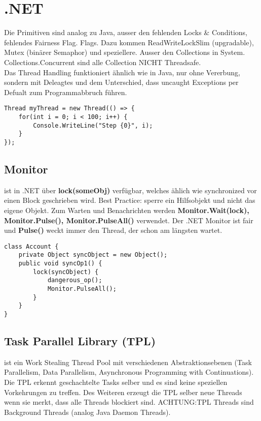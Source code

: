 \section{.NET}
Die Primitiven sind analog zu Java, ausser den fehlenden Locks \& Conditions, fehlendes Fairness Flag. Flags. Dazu kommen ReadWriteLockSlim (upgradable), Mutex (binärer Semaphor) und speziellere. Ausser den Collections in System. Collections.Concurrent sind alle Collection NICHT Threadsafe. \\

Das Thread Handling funktioniert ähnlich wie in Java, nur ohne Vererbung, sondern mit Deleagtes und dem Unterschied, dass uncaught Exceptions per Defualt zum Programmabbruch führen. 

\begin{lstlisting}[style=csharp]
Thread myThread = new Thread(() => {
	for(int i = 0; i < 100; i++) {
		Console.WriteLine("Step {0}", i);
	}
});
\end{lstlisting}

\subsection{Monitor}
ist in .NET über \textbf{lock(someObj)} verfügbar, welches ählich wie synchronized vor einen Block geschrieben wird. Best Practice: sperre ein Hilfsobjekt und nicht das eigene Objekt. Zum Warten und Benachrichten werden \textbf{Monitor.Wait(lock), Monitor.Pulse(), Monitor.PulseAll()} verwendet. Der .NET Monitor ist fair und \textbf{Pulse()} weckt immer den Thread, der schon am längsten wartet.

\begin{lstlisting}[style=csharp]
class Account {
	private Object syncObject = new Object();
	public void syncOp1() {
		lock(syncObject) {
			dangerous_op();
			Monitor.PulseAll();
		}
	}
}
\end{lstlisting}

\subsection{Task Parallel Library (TPL)}
ist ein Work Stealing Thread Pool mit verschiedenen Abstraktionsebenen (Task Parallelism, Data Parallelism, Asynchronous Programming with Continuations). Die TPL erkennt geschachtelte Tasks selber und es sind keine speziellen Vorkehrungen zu treffen. Des Weiteren erzeugt die TPL selber neue Threads wenn sie merkt, dass alle Threads blockiert sind. ACHTUNG:TPL Threads sind Background Threads (analog Java Daemon Threads).

